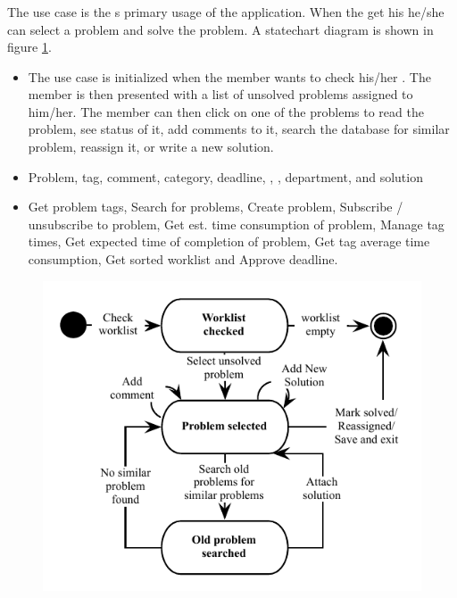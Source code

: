 \subsubsection{\ucsolproblem[c]} The use case \ucsolproblem{} is the \astaff{}s primary usage of the application. When the \astaff[] get his \todolist[] he/she can select a problem and solve the problem. A statechart diagram is shown in figure \ref{fig:solve_problem_use_case}.

\begin{itemize}
\item {} The use case is initialized when the \astaff[] member wants to check his/her \todolist[]. The \astaff[] member is then presented with a list of unsolved problems assigned to him/her. The \astaff[] member can then click on one of the problems to read the problem, see status of it, add comments to it, search the database for similar problem, reassign it, or write a new solution. 

\item {} Problem, tag, comment, category, deadline, \client[], \staff[], department, and solution

\item {} Get problem tags, Search for problems, Create problem, Subscribe / unsubscribe to problem, Get est. time consumption of problem, Manage tag times, Get expected time of completion of problem, Get tag average time consumption, Get sorted worklist and Approve deadline. 
\end{itemize}

\begin{figure}[htbp]
\begin{center}
 \includegraphics[scale=0.8]{input/application_domain_analysis/solve_problem_use_case}
\label{fig:solve_problem_use_case}
\end{center}
\end{figure}

